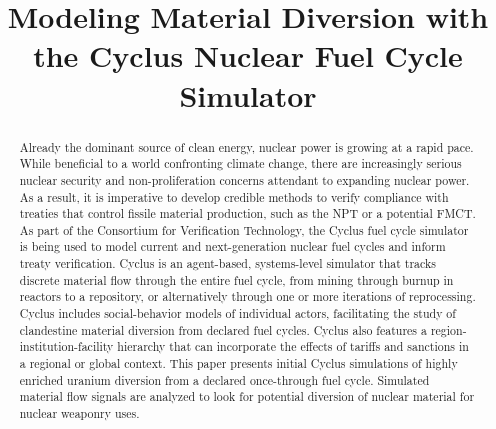 \documentclass[12pt]{paper}
\begin{document}
\title{Modeling Material Diversion with the Cyclus Nuclear Fuel Cycle Simulator
}


\date{}


\maketitle



\begin{abstract}

  Already the dominant source of clean energy, nuclear power is growing at a
  rapid pace.  While beneficial to a world confronting climate change, there
  are increasingly serious nuclear security and non-proliferation concerns
  attendant to expanding nuclear power. As a result, it is imperative to develop
  credible methods to verify compliance with treaties that control fissile
  material production, such as the \gls{NPT} or a potential
  \gls{FMCT}. As part of the Consortium for Verification
  Technology, the Cyclus fuel cycle simulator is being used to model current
  and next-generation nuclear fuel cycles and inform treaty verification. Cyclus
  is an agent-based, systems-level simulator that tracks discrete material flow
  through the entire fuel cycle, from mining through burnup in reactors to a
  repository, or alternatively through one or more iterations of reprocessing.
  Cyclus includes social-behavior models of individual actors, facilitating the
  study of clandestine material diversion from declared fuel cycles.  Cyclus
  also features a region-institution-facility hierarchy that can incorporate the
  effects of tariffs and sanctions in a regional or global context.  This paper
  presents initial Cyclus simulations of highly enriched uranium diversion from
  a declared once-through fuel cycle.  Simulated material flow signals are
  analyzed to look for potential diversion of nuclear material for nuclear
  weaponry uses.


\end{abstract}











%
\end{document}

